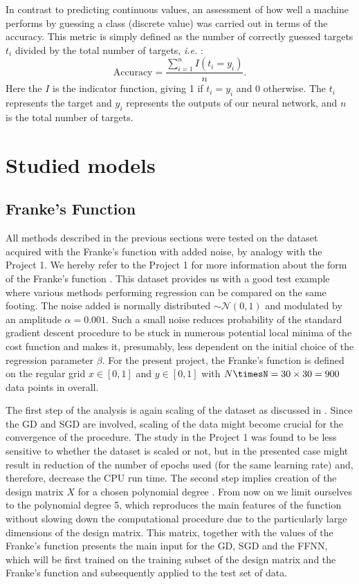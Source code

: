 \documentclass{emulateapj}
\begin{document}
In contrast to predicting continuous values, an assessment of how well a machine performs by guessing a class (discrete value) was carried out in terms of the accuracy. This metric is simply defined as the number of correctly guessed targets $t_i$ divided by the total number of targets, \textit{i.e.} \cite{Morten}:
 \begin{equation}
     \mathrm{Accuracy} = \frac{\sum_{i=1}^{n} I(t_i = y_i)}{n}.
 \end{equation}
 Here the $I$ is the indicator function, giving 1 if $t_i = y_i$ and $0$ otherwise. The $t_i$ represents the target and $y_i$ represents the outputs of our neural network, and $n$ is the total number of targets.
 
\section{Studied models}
\label{sec: Studied models} 

\subsection{Franke's Function}\label{subsec: franke function}

All methods described in the previous sections were tested on the dataset acquired with the Franke's function with added noise, by analogy with the Project 1. We hereby refer to the Project 1 for more information about the form of the Franke's function \cite{proj1, proj1_2}. This dataset provides us with a good test example where various methods performing regression can be compared on the same footing. The noise added is normally distributed $\sim\mathcal{N}(0,1)$ and modulated by an amplitude $\alpha=0.001$. Such a small noise reduces probability of the standard gradient descent procedure to be stuck in numerous potential  local minima of the cost function and makes it, presumably, less dependent on the initial choice of the regression parameter $\beta$.  For the present project, the Franke's function is defined on the regular grid $x\in[0,1]$ and $y\in[0,1]$ with $N\timesN=30\times 30=900$ data points in overall.

The first step of the analysis is again scaling of the dataset as discussed in \cite{proj1, proj1_2}. Since the GD and SGD are involved, scaling of the data might become crucial for the convergence of the procedure. The study in the Project 1 was found to be less sensitive to whether the dataset is scaled or not, but in the presented case might result in reduction of the number of epochs used (for the same learning rate) and, therefore, decrease the CPU run time. The second step implies creation of the design matrix $X$ for a chosen polynomial degree \cite{proj1, proj1_2}. From now on we limit ourselves to the polynomial degree 5, which reproduces the main features of the function without slowing down the computational procedure due to the particularly large dimensions of the design matrix. This matrix, together with the values of the Franke's function presents the main input for the GD, SGD and the FFNN, which will be first trained on the training subset of the design matrix and the Franke's function and subsequently applied to the test set of data. 
\end{document}
